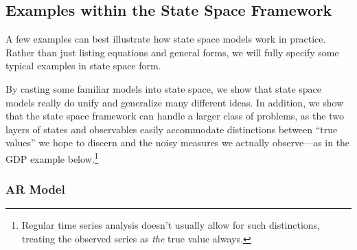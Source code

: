 \documentclass[a4paper,12pt]{article}
\begin{document}
\subsection{Examples within the State Space Framework}

A few examples can best illustrate how state space models work in practice. Rather than just listing equations and general forms, we will fully specify some typical examples in state space form.

By casting some familiar models into state space, we show that state space models really do unify and generalize many different ideas. In addition, we show that the state space framework can handle a larger class of problems, as the two layers of states and observables easily accommodate distinctions between ``true values'' we hope to discern and the noisy measures we actually observe---as in the GDP example below.\footnote{Regular time series analysis doesn't usually allow for such distinctions, treating the observed series as \emph{the} true value always.}

\subsubsection{AR Model}
\end{document}
